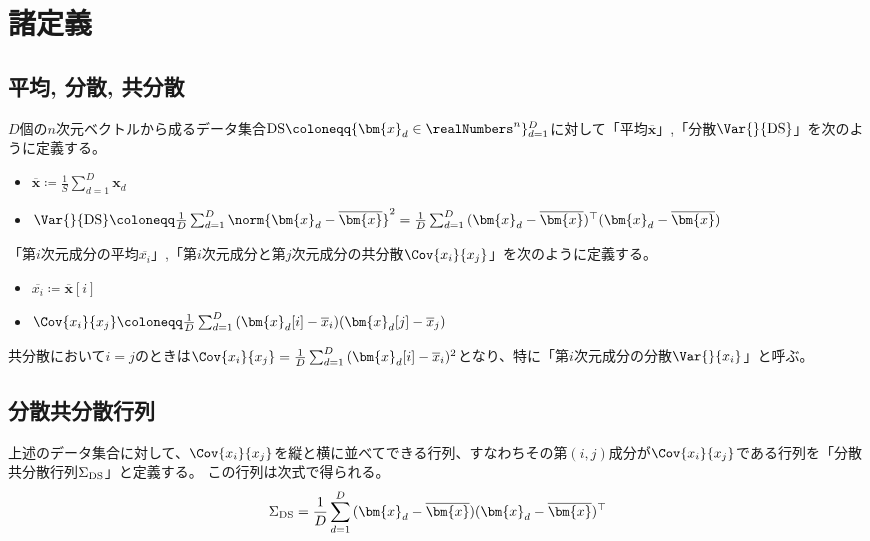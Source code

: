 \chapter{諸定義}
    \section{平均, 分散, 共分散}
        $D$個の$n$次元ベクトルから成るデータ集合$\DS \coloneqq \{\bm{x}_d\in\realNumbers^n\}_{d=1}^D$に対して「平均$\overline{\bm{x}}$」,「分散$\Var{}{\DS}$」を次のように定義する。
        \begin{itemize}
            \item $\overline{\bm{x}} \coloneqq \frac{1}{S}\sum_{d=1}^D{\bm{x}_d}$
            \item $\Var{}{\DS} \coloneqq \frac{1}{D}\sum_{d=1}^D{\norm{\bm{x}_d-\overline{\bm{x}}}^2} = \frac{1}{D}\sum_{d=1}^D{(\bm{x}_d-\overline{\bm{x}})^\top(\bm{x}_d-\overline{\bm{x}})}$
        \end{itemize}
        「第$i$次元成分の平均$\overline{x_i}$」,「第$i$次元成分と第$j$次元成分の共分散$\Cov{x_i}{x_j}$」を次のように定義する。
        \begin{itemize}
            \item $\overline{x_i} \coloneqq \overline{\bm{x}}[i]$
            \item $\Cov{x_i}{x_j} \coloneqq \frac{1}{D}\sum_{d=1}^D{(\bm{x}_d[i]-\overline{x}_i)(\bm{x}_d[j]-\overline{x}_j)}$
        \end{itemize}
        共分散において$i=j$のときは$\Cov{x_i}{x_j} = \frac{1}{D}\sum_{d=1}^D{(\bm{x}_d[i]-\overline{x}_i)^2}$となり、特に「第$i$次元成分の分散$\Var{}{x_i}$」と呼ぶ。
    \section{分散共分散行列}
        上述のデータ集合に対して、$\Cov{x_i}{x_j}$を縦と横に並べてできる行列、すなわちその第$(i,j)$成分が$\Cov{x_i}{x_j}$である行列を「分散共分散行列$\Sigma_{\textrm{DS}}$」と定義する。
        この行列は次式で得られる。
        \[\Sigma_{\DS} = \frac{1}{D}\sum_{d=1}^D{(\bm{x}_d-\overline{\bm{x}})(\bm{x}_d-\overline{\bm{x}})^\top}\]
        \par